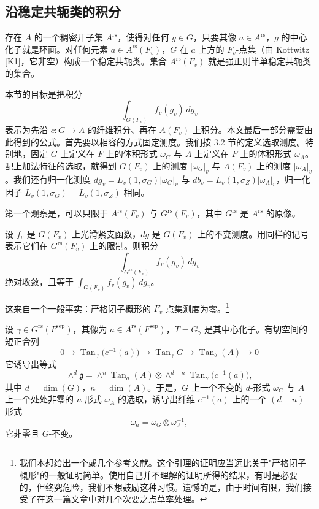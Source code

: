 \subsection{沿稳定共轭类的积分}

存在 $A$ 的一个稠密开子集 $A^{\mathrm{rs}}$，使得对任何 $g\in G$，只要其像 $a\in A^{\mathrm{rs}}$，$g$ 的中心化子就是环面。对任何元素 $a\in A^{\mathrm{rs}}(F_v)$，$G$ 在 $a$ 上方的 $F_v$-点集（由 Kottwitz [K1]，它非空）构成一个稳定共轭类。集合 $A^{\mathrm{rs}}(F_v)$ 就是强正则半单稳定共轭类的集合。

本节的目标是把积分
\[
\int_{G(F_v)}f_v(g_v)\,dg_v
\]
表示为先沿 $c:G\to A$ 的纤维积分、再在 $A(F_v)$ 上积分。本文最后一部分需要由此得到的公式。首先要以相容的方式固定测度。我们按 3.2 节的定义选取测度。特别地，固定 $G$ 上定义在 $F$ 上的体积形式 $\omega_G$ 与 $A$ 上定义在 $F$ 上的体积形式 $\omega_A$。配上加法特征的选取，就得到 $G(F_v)$ 上的测度 $|\omega_G|_v$ 与 $A(F_v)$ 上的测度 $|\omega_A|_v$。我们还有归一化测度 $dg_v=L_v(1,\sigma_G)|\omega_G|_v$ 与 $db_v=L_v(1,\sigma_Z)|\omega_A|_v$，归一化因子 $L_v(1,\sigma_G)=L_v(1,\sigma_Z)$ 相同。

第一个观察是，可以只限于 $A^{\mathrm{rs}}(F_v)$ 与 $G^{\mathrm{rs}}(F_v)$，其中 $G^{\mathrm{rs}}$ 是 $A^{\mathrm{rs}}$ 的原像。

\setcounter{theorem}{25}
\begin{lemma}
设 $f_v$ 是 $G(F_v)$ 上光滑紧支函数，$dg$ 是 $G(F_v)$ 上的不变测度。用同样的记号表示它们在 $G^{\mathrm{rs}}(F_v)$ 上的限制。则积分
\[
\int_{G^{\mathrm{rs}}(F_v)}f_v(g_v)\,dg_v
\]
绝对收敛，且等于 $\int_{G(F_v)}f_v(g_v)\,dg_v$。
\end{lemma}

这来自一个一般事实：严格闭子概形的 $F_v$-点集测度为零。\footnote{我们本想给出一个或几个参考文献。这个引理的证明应当远比关于"严格闭子概形"的一般证明简单。使用自己并不理解的证明所得的结果，有时是必要的，但终究危险，我们不想鼓励这种习惯。遗憾的是，由于时间有限，我们接受了在这一篇文章中对几个次要之点草率处理。}

设 $\gamma\in G^{\mathrm{rs}}(F^{\mathrm{sep}})$，其像为 $a\in A^{\mathrm{rs}}(F^{\mathrm{sep}})$，$T=G_\gamma$ 是其中心化子。有切空间的短正合列
\[
0\to\operatorname{Tan}_\gamma\bigl(c^{-1}(a)\bigr)\to\operatorname{Tan}_\gamma G\to\operatorname{Tan}_b(A)\to0
\]
它诱导出等式
\begin{equation}\tag{3.27}
\wedge^d\mathfrak g=\wedge^n\operatorname{Tan}_a(A)\otimes\wedge^{d-n}\operatorname{Tan}_\gamma\bigl(c^{-1}(a)\bigr),
\end{equation}
其中 $d=\dim(G)$，$n=\dim(A)$。于是，$G$ 上一个不变的 $d$-形式 $\omega_G$ 与 $A$ 上一个处处非零的 $n$-形式 $\omega_A$ 的选取，诱导出纤维 $c^{-1}(a)$ 上的一个 $(d-n)$-形式
\[
\omega_a=\omega_G\otimes\omega_A^{-1},
\]
它非零且 $G$-不变。

